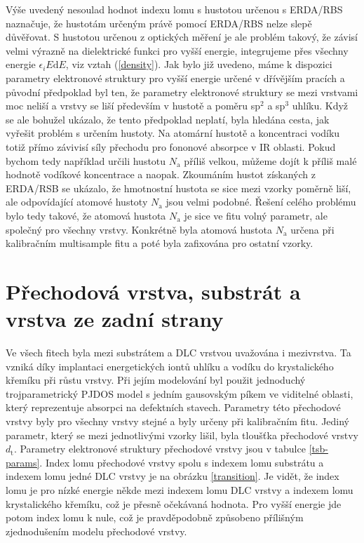 Výše uvedený nesoulad hodnot indexu lomu s hustotou určenou s ERDA/RBS naznačuje, že hustotám určeným právě pomocí ERDA/RBS nelze slepě důvěřovat. S hustotou určenou z optických měření je ale problém takový, že závisí velmi výrazně na dielektrické funkci pro vyšší energie, integrujeme přes všechny energie $\epsilon_i E \mathrm{d}E$, viz vztah (\ref{density}). 
Jak bylo již uvedeno, máme k dispozici parametry elektronové struktury pro vyšší energie určené v dřívějším pracích a původní předpoklad byl ten, že parametry elektronové struktury se mezi vrstvami moc neliší a vrstvy se liší především v hustotě a poměru sp$^2$ a sp$^3$ uhlíku. Když se ale bohužel ukázalo, že tento předpoklad neplatí, byla hledána cesta, jak vyřešit problém s určením hustoty. Na atomární hustotě a koncentraci vodíku totiž přímo závivisí síly přechodu pro fononové absorpce v IR oblasti. 
Pokud bychom tedy například určili hustotu $N_\mathrm{a}$ příliš velkou, můžeme dojít k příliš malé hodnotě vodíkové koncentrace a naopak. Zkoumáním hustot získaných z ERDA/RSB se ukázalo, že hmotnostní hustota se sice mezi vzorky poměrně liší, ale odpovídající atomové hustoty $N_\mathrm{a}$ jsou velmi podobné. 
Řešení celého problému bylo tedy takové, že atomová hustota $N_\mathrm{a}$ je sice ve fitu volný parametr, ale společný pro všechny vrstvy. Konkrétně byla atomová hustota $N_\mathrm{a}$ určena při kalibračním multisample fitu a poté byla zafixována pro ostatní vzorky.

\section{Přechodová vrstva, substrát a vrstva ze zadní strany}
Ve všech fitech byla mezi substrátem a DLC vrstvou uvažována i mezivrstva. Ta vzniká díky implantaci energetických iontů uhlíku a vodíku do krystalického křemíku při růstu vrstvy. 
Při jejím modelování byl použit jednoduchý trojparametrický PJDOS model s jedním gausovským píkem ve viditelné oblasti, který reprezentuje absorpci na defektních stavech. 
Parametry této přechodové vrstvy byly pro všechny vrstvy stejné a byly určeny při kalibračním fitu. Jediný parametr, který se mezi jednotlivými vzorky lišil, byla tloušťka přechodové vrstvy $d_\mathrm{t}$. 
Parametry elektronové struktury přechodové vrstvy jsou v tabulce \ref{tsb-params}. Index lomu přechodové vrstvy spolu s indexem lomu substrátu a indexem lomu jedné DLC vrstvy je na obrázku \ref{transition}. 
Je vidět, že index lomu je pro nízké energie někde mezi indexem lomu DLC vrstvy a indexem lomu krystalického křemíku, což je přesně očekávaná hodnota. Pro vyšší energie jde potom index lomu k nule, což je pravděpodobně způsobeno přílišným zjednodušením modelu přechodové vrstvy.

